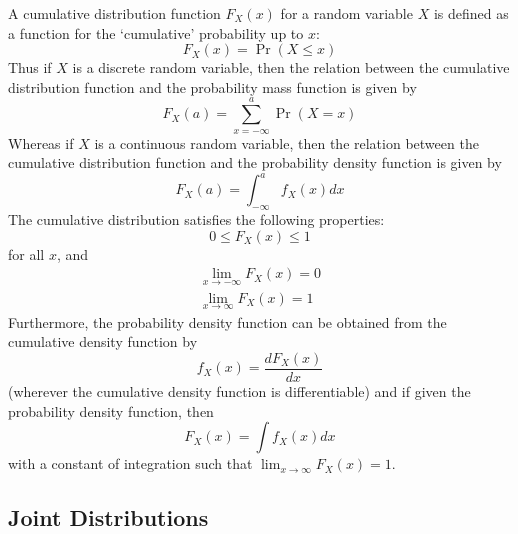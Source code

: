 \documentclass[11pt]{report} %
\begin{document}
A cumulative distribution function $F_{X}\left(x\right)$ for a random variable $X$ is defined as a function for the `cumulative' probability up to $x$:
\begin{equation}
F_{X}\left(x\right) = \operatorname{Pr}\left(X \leq x\right)
\end{equation}
Thus if $X$ is a discrete random variable, then the relation between the cumulative distribution function and the probability mass function is given by
\begin{equation}
F_{X}\left(a\right) = \sum_{x = -\infty}^{a}\operatorname{Pr}\left(X = x\right)
\end{equation}
Whereas if $X$ is a continuous random variable, then the relation between the cumulative distribution function and the probability density function is given by
\begin{equation}
F_{X}\left(a\right) = \int_{-\infty}^{a}f_{X}\left(x\right)dx
\end{equation}
The cumulative distribution satisfies the following properties:
\begin{equation}
0 \leq F_{X}\left(x\right) \leq 1
\end{equation}
for all $x$, and
\begin{gather}
\lim_{x\to -\infty}F_{X}\left(x\right) = 0 \\
\lim_{x\to \infty}F_{X}\left(x\right) = 1
\end{gather}
Furthermore, the probability density function can be obtained from the cumulative density function by
\begin{equation}
f_{X}\left(x\right) = \dfrac{dF_{X}\left(x\right)}{dx}
\end{equation}
(wherever the cumulative density function is differentiable) and if given the probability density function, then
\begin{equation}
F_{X}\left(x\right) = \int f_{X}\left(x\right)dx
\end{equation}
with a constant of integration such that $\lim_{x\to \infty}F_{X}\left(x\right) = 1$.

\subsection{Joint Distributions}
\end{document}
